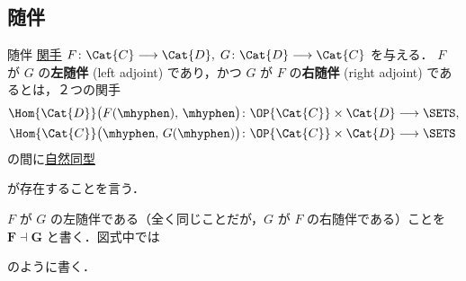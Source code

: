 \documentclass[TQFT_main]{subfiles}
\begin{document}
\subsection{随伴}

\begin{mydef}[label=def:adjoint]{随伴}
    \hyperref[def:functor]{関手} $F \colon \Cat{C} \lto \Cat{D},\; G \colon \Cat{D} \lto \Cat{C}$ を与える．
    $F$ が $G$ の\textbf{左随伴} (left adjoint) であり，かつ $G$ が $F$ の\textbf{右随伴} (right adjoint) であるとは，２つの関手
    \begin{align}
        \Hom{\Cat{D}} \bigl( F(\mhyphen),\, \mhyphen \bigr) \colon \OP{\Cat{C}} \times \Cat{D} &\lto \SETS, \\
        \Hom{\Cat{C}} \bigl( \mhyphen,\, G(\mhyphen) \bigr) \colon \OP{\Cat{C}} \times \Cat{D} &\lto \SETS
    \end{align}
    の間に\hyperref[def:nat]{自然同型}
    \begin{center}
    \end{center}
    が存在することを言う．

    \tcblower

    $F$ が $G$ の左随伴である（全く同じことだが，$G$ が $F$ の右随伴である）ことを $\bm{F \dashv G}$ と書く．図式中では
    \begin{center}
    \end{center}
    のように書く．
\end{mydef}
\end{document}
